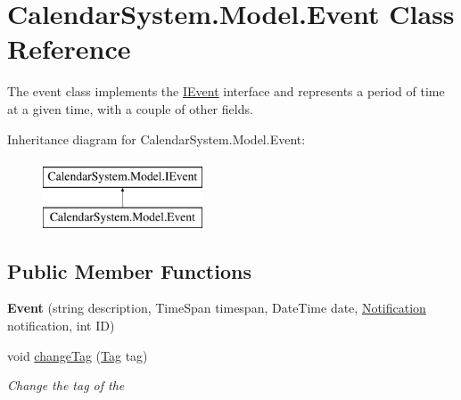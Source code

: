 \hypertarget{class_calendar_system_1_1_model_1_1_event}{\section{Calendar\+System.\+Model.\+Event Class Reference}
\label{class_calendar_system_1_1_model_1_1_event}
}


The event class implements the \hyperlink{interface_calendar_system_1_1_model_1_1_i_event}{I\+Event} interface and represents a period of time at a given time, with a couple of other fields.  


Inheritance diagram for Calendar\+System.\+Model.\+Event\+:\begin{figure}[H]
\begin{center}
\leavevmode
\includegraphics[height=2.000000cm]{class_calendar_system_1_1_model_1_1_event}
\end{center}
\end{figure}
\subsection*{Public Member Functions}
\begin{DoxyCompactItemize}
\item 
\hypertarget{class_calendar_system_1_1_model_1_1_event_a83bdd9e5882ea17cc8ccf8fa90b05267}{{\bfseries Event} (string description, Time\+Span timespan, Date\+Time date, \hyperlink{class_calendar_system_1_1_model_1_1_notification}{Notification} notification, int I\+D)}\label{class_calendar_system_1_1_model_1_1_event_a83bdd9e5882ea17cc8ccf8fa90b05267}

\item 
void \hyperlink{class_calendar_system_1_1_model_1_1_event_a3815e61cea5e1c94fe29ffcc103c1c6f}{change\+Tag} (\hyperlink{class_calendar_system_1_1_model_1_1_tag}{Tag} tag)
\begin{DoxyCompactList}\small\item\em Change the tag of the \end{DoxyCompactList}\end{DoxyCompactItemize}
